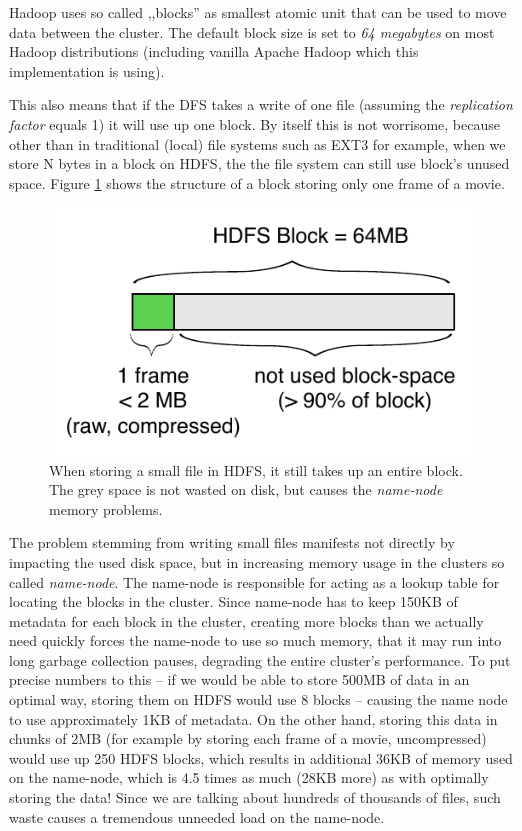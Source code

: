 Hadoop uses so called ,,blocks'' as smallest atomic unit that can be used to move data between the cluster.
The default block size is set to \textit{64 megabytes} on most Hadoop distributions (including vanilla Apache Hadoop which this implementation is using).

This also means that if the DFS takes a write of one file (assuming the \textit{replication factor} equals 1) it will use up one block.
By itself this is not worrisome, because other than in traditional (local) file systems such as EXT3 for example, when we store N bytes in a block on HDFS,
the the file system can still use block's unused space. Figure \ref{fig:no-sequence-file} shows the structure of a block storing only one frame of a movie.

\begin{figure}[ch!]
  \centering
  \includegraphics[scale=0.9]{diagrams/no-sequence-file.pdf}
  \caption{When storing a small file in HDFS, it still takes up an entire block. The grey space is not wasted on disk, but causes the \textit{name-node} memory problems.}
  \label{fig:no-sequence-file}
\end{figure}

The problem stemming from writing small files manifests not directly by impacting the used disk space, but in increasing memory usage in the clusters so called \textit{name-node}. The name-node is responsible for acting as a lookup table for locating the blocks in the cluster. Since name-node has to keep 150KB of metadata for each block in the cluster, creating more blocks than we actually need quickly forces the name-node to use so much memory, that it may run into long garbage collection pauses, degrading the entire cluster's performance. To put precise numbers to this -- if we would be able to store 500MB of data in an optimal way, storing them on HDFS would use 8 blocks -- causing the name node to use approximately 1KB of metadata. On the other hand, storing this data in chunks of 2MB (for example by storing each frame of a movie, uncompressed) would use up 250 HDFS blocks, which results in additional 36KB of memory used on the name-node, which is 4.5 times as much (28KB more) as with optimally storing the data! Since we are talking about hundreds of thousands of files, such waste causes a tremendous unneeded load on the name-node.

